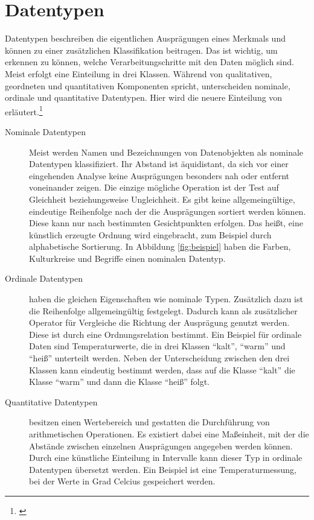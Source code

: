 \documentclass[a4paper, 
               12pt,
               DIV=calc,
               version=first,
               pdftex,
               headsepline,
               footsepline,
               bibliography=totocnumbered,
               listof=numbered]{scrreprt}
\begin{document}
\section{Datentypen}
\label{sec:Datentypen}
Datentypen beschreiben die eigentlichen Ausprägungen eines Merkmals und können zu einer zusätzlichen
Klassifikation beitragen. Das ist wichtig, um erkennen zu können, welche Verarbeitungschritte mit den Daten
möglich sind. Meist erfolgt eine Einteilung in drei Klassen. Während \cite{Bertin} von qualitativen,
geordneten und quantitativen Komponenten spricht, unterscheiden \cite{Preim} nominale, ordinale und
quantitative Datentypen.
Hier wird die neuere Einteilung von \cite{Preim} erläutert.\footnote{\citep[S.\,449]{Preim}}
\begin{description}
\item[Nominale Datentypen]
Meist werden Namen und Bezeichnungen von Datenobjekten als nominale Datentypen klassifiziert.
Ihr Abstand ist äquidistant, da sich vor einer eingehenden Analyse
keine Ausprägungen besonders nah oder entfernt voneinander zeigen. Die einzige mögliche Operation ist der Test auf
Gleichheit beziehungsweise Ungleichheit. Es gibt keine allgemeingültige, eindeutige Reihenfolge
nach der die Ausprägungen sortiert werden können. Diese kann nur nach bestimmten Gesichtpunkten erfolgen.
Das heißt, eine künstlich erzeugte Ordnung wird eingebracht, zum Beispiel durch alphabetische Sortierung.
In Abbildung \ref{fig:beispiel} haben die Farben, Kulturkreise und Begriffe einen nominalen Datentyp.
\item[Ordinale Datentypen]
haben die gleichen Eigenschaften wie nominale Typen.
Zusätzlich dazu ist die Reihenfolge allgemeingültig festgelegt. Dadurch kann als zusätzlicher Operator für Vergleiche die Richtung der
Ausprägung genutzt werden. Diese ist durch eine Ordnungsrelation bestimmt. Ein Beispiel für ordinale Daten sind Temperaturwerte,
die in drei Klassen "`kalt"', "`warm"' und "`heiß"' unterteilt werden. Neben der Unterscheidung zwischen den drei
Klassen kann eindeutig bestimmt werden, dass auf die Klasse "`kalt"' die Klasse "`warm"' und dann die Klasse
"`heiß"' folgt. 
\item[Quantitative Datentypen] besitzen einen Wertebereich und gestatten die Durchführung von arithmetischen Operationen.
Es existiert dabei eine Maßeinheit, mit der die Abstände zwischen einzelnen Ausprägungen angegeben werden können. Durch eine 
künstliche Einteilung in Intervalle kann dieser Typ in ordinale Datentypen übersetzt werden.
Ein Beispiel ist eine Temperaturmessung, bei der Werte in Grad Celcius gespeichert werden.
\end{description}
\end{document}
